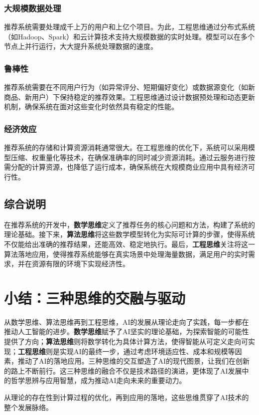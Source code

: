 \subsubsection*{大规模数据处理}
推荐系统需要处理成千上万的用户和上亿个项目。为此，工程思维通过分布式系统（如Hadoop、Spark）和云计算技术支持大规模数据的实时处理。模型可以在多个节点上并行运行，大大提升系统处理数据的速度。

\subsubsection*{鲁棒性}
推荐系统需要在不同用户行为（如异常评分、短期偏好变化）或数据源变化（如新商品、新用户）下保持稳定的推荐效果。工程思维通过设计数据预处理和动态更新机制，确保系统在面对这些变化时依然具有稳定的性能。

\subsubsection*{经济效应}
推荐系统的存储和计算资源消耗通常很大。在工程思维的优化下，系统可以采用模型压缩、权重量化等技术，在确保准确率的同时减少资源消耗。通过云服务进行按需分配的计算资源，也降低了运行成本，确保系统在大规模商业应用中具有经济可行性。


\subsection{ 综合说明}

在推荐系统的开发中，{\bf 数学思维}定义了推荐任务的核心问题和方法，构建了系统的理论基础。接下来，{\bf 算法思维}将这些数学模型转化为实际可计算的步骤，使得系统不仅能给出准确的推荐结果，还能高效、稳定地执行。最后，{\bf 工程思维}关注将这一算法落地应用，使得推荐系统能够在真实场景中处理海量数据，满足用户的实时需求，并在资源有限的环境下实现经济性。


\section{ 小结：三种思维的交融与驱动}

从数学思维、算法思维再到工程思维，AI的发展从理论走向了实践，每一步都在推动人工智能的进步。{\bf 数学思维}赋予了AI坚实的理论基础，为探索智能的可能性提供了方向；{\bf 算法思维}则将数学转化为具体计算方法，使得智能从可定义走向可实现；{\bf 工程思维}则是实现AI的最终一步，通过考虑环境适应性、成本和规模等因素，推动了AI的落地应用。三种思维的交互塑造了AI的现代图景，让我们在创新的路上不断前行。这三种思维的融合不仅是技术路径的演进，更体现了AI发展中的哲学思辨与应用智慧，成为推动AI走向未来的重要动力。

从理论的存在性到计算过程的优化，再到应用的落地，这些思维贯穿了AI技术的整个发展脉络。

\nocite{*}
\printbibliography[heading=bibintoc, title=\ebibname]
\appendix

\newpage